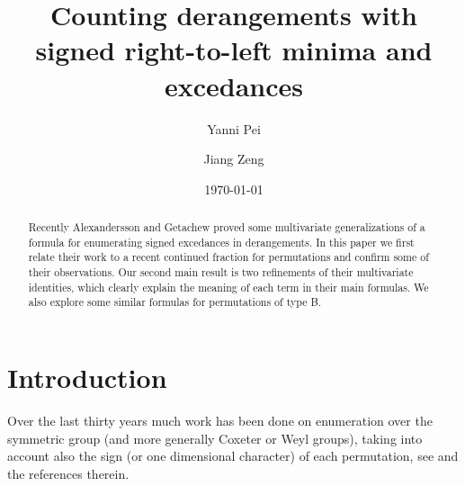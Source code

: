 \documentclass[12pt,reqno]{amsart}
\numberwithin{equation}{section}
\newcounter{num}
\begin{document}
\title[Counting  derangements ]{Counting  derangements with signed right-to-left minima and excedances}
\author{Yanni Pei}
\address[Yanni Pei]{School of Mathematical Sciences,
 Dalian University of Technology, Dalian 116024, P. R. China}

\author[Jiang Zeng]{Jiang Zeng}
\address[Jiang Zeng]{Univ Lyon, Universit\'e Claude Bernard Lyon 1, CNRS UMR 5208, Institut Camille Jordan, 43 blvd. du 11 novembre 1918, F-69622 Villeurbanne cedex, France}
\date{\today}



\begin{abstract}
Recently  Alexandersson and Getachew proved some 
multivariate  generalizations of a 
 formula for enumerating signed excedances  in  derangements. In this paper  we first relate  their work to  a recent continued fraction  for  permutations  and  confirm  some of their observations. Our second main result is two refinements of 
their multivariate identities, which clearly explain  
the meaning  of each term  in their main  formulas.
 We
also  explore   some
similar  formulas  for permutations of type B.
\end{abstract}

\maketitle
\section{Introduction}
Over the last thirty years much work has been done  on enumeration over the symmetric group (and more generally  Coxeter or Weyl  groups), taking
into account also the sign (or one dimensional character) of each permutation, see 
\cite{DF92, Wa92, AGR05, Zh13, ELL21, KZ03, Mo15, Si16, AG21} and the references therein.  
\end{document}
